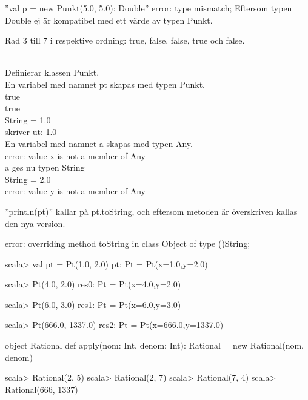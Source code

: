 ''val p = new Punkt(5.0, 5.0): Double'' error: type mismatch;
Eftersom typen Double ej är kompatibel med ett värde av typen Punkt.

\Subtask
Rad 3 till 7 i respektive ordning: true, false, false, true och false.

\Task %
\\Definierar klassen Punkt.
\\En variabel med namnet pt skapas med typen Punkt.\
\\true
\\true
\\String = 1.0
\\skriver ut: 1.0
\\En variabel med namnet a skapas med typen Any.
\\error: value x is not a member of Any
\\a ges nu typen String
\\String = 2.0
\\error: value y is not a member of Any

\Task %

\Subtask
''println(pt)'' kallar på pt.toString, och eftersom metoden är överskriven kallas den nya version.

\Subtask  {}

\Subtask
error: overriding method toString in class Object of type ()String;

\Task %

\Subtask
\begin{REPL}
scala> val pt = Pt(1.0, 2.0)
pt: Pt = Pt(x=1.0,y=2.0)

scala> Pt(4.0, 2.0)
res0: Pt = Pt(x=4.0,y=2.0)

scala> Pt(6.0, 3.0)
res1: Pt = Pt(x=6.0,y=3.0)

scala> Pt(666.0, 1337.0)
res2: Pt = Pt(x=666.0,y=1337.0)
\end{REPL}

\Subtask {}

\Subtask {}

\Subtask
\begin{REPLnonum}
object Rational {
def apply(nom: Int, denom: Int): Rational = new Rational(nom, denom)
}
\end{REPLnonum}

\Subtask
\begin{REPL}
scala> Rational(2, 5)
scala> Rational(2, 7)
scala> Rational(7, 4)
scala> Rational(666, 1337)
\end{REPL}

